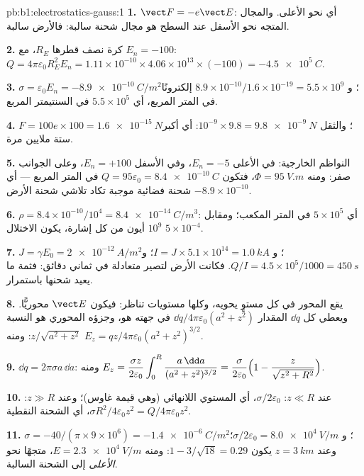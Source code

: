 \begin{solution}{pb:b1:electrostatics-gauss:1}
\textbf{1.} $\vect F = -e\vect E$: أي نحو الأعلى. والمجال المتجه نحو الأسفل عند السطح
هو مجال شحنة سالبة: فالأرض سالبة.

\textbf{2.} كرة نصف قطرها $R_E$، مع $E_n = -100$: $Q = 4\pi\varepsilon_0R_E^2E_n =
1.11 \times 10^{-10} \times 4.06 \times 10^{13} \times (-100) = \qty{-4.5e5}{C}$.

\textbf{3.} $\sigma = \varepsilon_0E_n = \qty{-8.9e-10}{C/m^2}$؛ و $8.9 \times 10^{-10}/1.6 \times
10^{-19} = 5.5 \times 10^9$ إلكترونًا في المتر المربع، أي $5.5 \times 10^5$ في
السنتيمتر المربع.

\textbf{4.} $F = 100e \times 100 = \qty{1.6e-15}{N}$؛ والثقل $10^{-9} \times 9.8 =
\qty{9.8e-9}{N}$: أي أكبر ستة ملايين مرة.

\textbf{5.} النواظم الخارجية: في الأعلى $E_n = -5$، وفي الأسفل $E_n = +100$، وعلى الجوانب
صفر: ومنه $\Phi = \qty{95}{V.m}$، فتكون $Q = 95\varepsilon_0 = \qty{+8.4e-10}{C}$ في المتر
المربع --- أي شحنة فضائية موجبة تكاد تلاشي شحنة الأرض
$-8.9 \times 10^{-10}$.

\textbf{6.} $\rho = 8.4 \times 10^{-10}/10^4 = \qty{8.4e-14}{C/m^3}$: أي $5 \times 10^5$
 في المتر المكعب؛ ومقابل $10^9$ أيون من كل إشارة،
يكون الاختلال $5 \times 10^{-4}$.

\textbf{7.} $J = \gamma E_0 = \qty{2e-12}{A/m^2}$؛ و $I = J \times 5.1 \times 10^{14} =
\qty{1.0}{kA}$؛ و $Q/I = 4.5 \times 10^5/1000 = \qty{450}{s}$. فكانت الأرض لتصير
متعادلة في ثماني دقائق: فثمة ما يعيد شحنها باستمرار.

\textbf{8.} يقع المحور في كل مستوٍ يحويه، وكلها مستويات
تناظر: فيكون $\vect E$ محوريًّا. ويعطي كل $\dd q$ المقدار $\dd q/4\pi\varepsilon_0(a^2 + z^2)$
في جهته هو، وجزؤه المحوري هو النسبة
$z/\sqrt{a^2 + z^2}$: ومنه $E_z = qz/4\pi\varepsilon_0(a^2 + z^2)^{3/2}$.

\textbf{9.} $\dd q = 2\pi\sigma a\,\dd a$: ومنه $E_z = \dfrac{\sigma z}{2\varepsilon_0}\displaystyle\int_0^R
\dfrac{a\,\dd a}{(a^2 + z^2)^{3/2}} = \dfrac{\sigma}{2\varepsilon_0}\Bigl(1 - \dfrac{z}{\sqrt{z^2
+ R^2}}\Bigr)$.

\textbf{10.} عند $z \ll R$: $\sigma/2\varepsilon_0$، أي المستوي اللانهائي (وهي قيمة غاوس)؛
وعند $z \gg R$: $\sigma R^2/4\varepsilon_0z^2 = Q/4\pi\varepsilon_0z^2$، أي الشحنة النقطية.

\textbf{11.} $\sigma = -40/(\pi \times 9 \times 10^6) = \qty{-1.4e-6}{C/m^2}$؛ و $\sigma/2\varepsilon_0 =
\qty{8.0e4}{V/m}$؛ وعند $z = \qty{3}{km}$ يكون $1 - 3/\sqrt{18} = 0.29$: ومنه $E =
\qty{2.3e4}{V/m}$، متجهًا نحو \emph{الأعلى} إلى الشحنة السالبة.


\end{solution}
